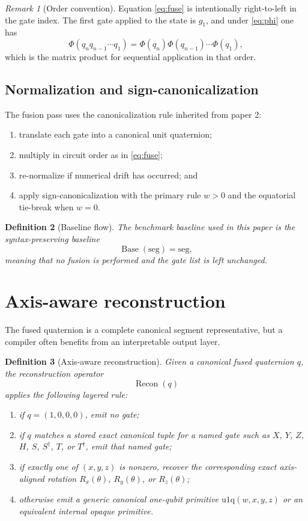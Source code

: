 \documentclass[11pt]{article}
\newtheorem{definition}{Definition}[section]
\theoremstyle{remark}
\newtheorem{remark}[definition]{Remark}
\newcommand{\uoneq}{\mathrm{u1q}}
\newcommand{\Recon}{\operatorname{Recon}}
\newcommand{\Baseline}{\operatorname{Base}}
\begin{document}
\begin{remark}[Order convention]
Equation \eqref{eq:fuse} is intentionally right-to-left in the gate index. The
first gate applied to the state is $g_1$, and under \eqref{eq:phi} one has
\[
\Phi(q_n q_{n-1}\cdots q_1)
=
\Phi(q_n)\Phi(q_{n-1})\cdots\Phi(q_1),
\]
which is the matrix product for sequential application in that order.
\end{remark}

\subsection{Normalization and sign-canonicalization}

The fusion pass uses the canonicalization rule inherited from paper 2:
\begin{enumerate}[label=(\arabic*), leftmargin=1.5em]
\item translate each gate into a canonical unit quaternion;
\item multiply in circuit order as in \eqref{eq:fuse};
\item re-normalize if numerical drift has occurred; and
\item apply sign-canonicalization with the primary rule $w>0$ and the
equatorial tie-break when $w=0$.
\end{enumerate}

\begin{definition}[Baseline flow]
The benchmark baseline used in this paper is the
\emph{syntax-preserving baseline}
\[
\Baseline(\mathrm{seg})=\mathrm{seg},
\]
meaning that no fusion is performed and the gate list is left unchanged.
\end{definition}

\section{Axis-aware reconstruction}

The fused quaternion is a complete canonical segment representative, but a
compiler often benefits from an interpretable output layer.

\begin{definition}[Axis-aware reconstruction]
Given a canonical fused quaternion $q$, the reconstruction operator
\[
\Recon(q)
\]
applies the following layered rule:
\begin{enumerate}[label=(\arabic*), leftmargin=1.5em]
\item if $q=(1,0,0,0)$, emit no gate;
\item if $q$ matches a stored exact canonical tuple for a named gate such as
$X$, $Y$, $Z$, $H$, $S$, $S^\dagger$, $T$, or $T^\dagger$, emit that named gate;
\item if exactly one of $(x,y,z)$ is nonzero, recover the corresponding exact
axis-aligned rotation $R_x(\theta)$, $R_y(\theta)$, or $R_z(\theta)$;
\item otherwise emit a generic canonical one-qubit primitive
$\uoneq(w,x,y,z)$ or an equivalent internal opaque primitive.
\end{enumerate}
\end{definition}
\end{document}
